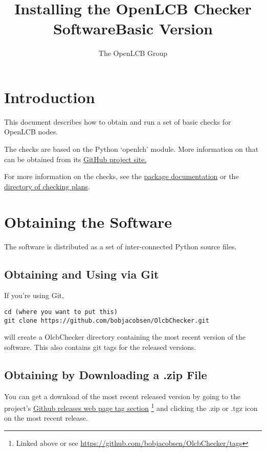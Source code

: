 \documentclass[11pt]{article}
\title{Installing the OpenLCB Checker Software\linebreak{}Basic Version}
\author{The OpenLCB Group}
\begin{document}
\maketitle


\section{Introduction}

This document describes how to obtain and run a set of basic checks for 
OpenLCB nodes.  

The checks are based on the Python `openlch' module.
More information on that can be obtained from its
\href{https://github.com/bobjacobsen/PythonOlcbNode}{GitHub project site.}

For more information on the checks, see the
\href{https://github.com/bobjacobsen/OlcbChecker/blob/main/README.md}{package documentation}
or the 
\href{https://github.com/bobjacobsen/OlcbChecker/tree/main/plans/}{directory of checking plans}.

\section{Obtaining the Software}

The software is distributed as a set of inter-connected Python source files.

\subsection{Obtaining and Using via Git}

If you're using Git, 
\begin{verbatim}
cd (where you want to put this)
git clone https://github.com/bobjacobsen/OlcbChecker.git
\end{verbatim}
will create a OlcbChecker directory containing the most recent version of the software.
This also contains git tags for the released versions.

\subsection{Obtaining by Downloading a .zip File}

You can get a download of the most recent released version by going to the project's 
\href{https://github.com/bobjacobsen/OlcbChecker/tags}{Github releases web page tag section}
\footnote{Linked above or see \href{https://github.com/bobjacobsen/OlcbChecker/tags}{https://github.com/bobjacobsen/OlcbChecker/tags}}
and clicking the .zip or .tgz icon on the most recent release.
\end{document}
